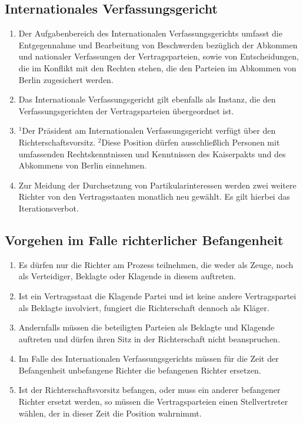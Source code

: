 \documentclass{article}
\begin{document}
\subsection{Internationales Verfassungsgericht}
\begin{enumerate}[(1)]
    \item Der Aufgabenbereich des Internationalen Verfassungsgerichts umfasst die Entgegennahme und Bearbeitung von Beschwerden bezüglich der Abkommen und nationaler Verfassungen der Vertragsparteien, sowie von Entscheidungen, die im Konflikt mit den Rechten stehen, die den Parteien im Abkommen von Berlin zugesichert werden.
    \item Das Internationale Verfassungsgericht gilt ebenfalls als Instanz, die den Verfassungsgerichten der Vertragsparteien übergeordnet ist.
    \item ${^1}$Der Präsident am Internationalen Verfassungsgericht verfügt über den Richterschaftsvorsitz. ${^2}$Diese Position dürfen ausschließlich Personen mit umfassenden Rechtskenntnissen und Kenntnissen des Kaiserpakts und des Abkommens von Berlin einnehmen.
    \item Zur Meidung der Durchsetzung von Partikularinteressen werden zwei weitere Richter von den Vertragsstaaten monatlich neu gewählt. Es gilt hierbei das Iterationsverbot.
\end{enumerate}

\subsection{Vorgehen im Falle richterlicher Befangenheit}
\begin{enumerate}[(1)]
    \item Es dürfen nur die Richter am Prozess teilnehmen, die weder als Zeuge, noch als Verteidiger, Beklagte oder Klagende in diesem auftreten.
    \item Ist ein Vertragsstaat die Klagende Partei und ist keine andere Vertragspartei als Beklagte involviert, fungiert die Richterschaft dennoch als Kläger.
    \item Andernfalls müssen die beteiligten Parteien als Beklagte und Klagende auftreten und dürfen ihren Sitz in der Richterschaft nicht beanspruchen.
    \item Im Falle des Internationalen Verfassungsgerichts müssen für die Zeit der Befangenheit unbefangene Richter die befangenen Richter ersetzen.
    \item Ist der Richterschaftsvorsitz befangen, oder muss ein anderer befangener Richter ersetzt werden, so müssen die Vertragsparteien einen Stellvertreter wählen, der in dieser Zeit die Position wahrnimmt.
\end{enumerate}
\end{document}
